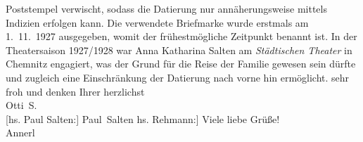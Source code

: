 \begin{ledgroupsized}[t]{13cm}
{{{                  Poststempel verwischt, sodass die Datierung nur annäherungsweise mittels Indizien
                  erfolgen kann. Die verwendete Briefmarke wurde erstmals am 1. 11. 1927 ausgegeben, womit der frühestmögliche Zeitpunkt benannt
                  ist. In der Theatersaison 1927/1928 war Anna Katharina Salten
                  am \emph{Städtischen Theater} in Chemnitz engagiert, was der Grund für die Reise der
                  Familie gewesen sein dürfte und zugleich eine Einschränkung der Datierung nach
                  vorne hin ermöglicht.}}}\label{K_L03580-1h} sehr froh und denken Ihrer herzlichst {\\}\spacefill\mbox{Otti S.}{\\}{[}hs. Paul Salten:{]} \spacefill\mbox{Paul Salten}\pend
           \pstart
           \noindent{}{[}hs. Rehmann:{]} Viele liebe Grüße! {\\}\spacefill\mbox{Annerl}\pend
           
         
         \endnumbering{}\end{ledgroupsized}  \newcommand{\dateiname}{L03580}\newcommand{\titel}{Felix Salten u. a. an Arthur Schnitzler, [November 1927 – Juni 1928?]}\newcommand{\editorInnen}{Martin Anton Müller und Laura Untner}
      
